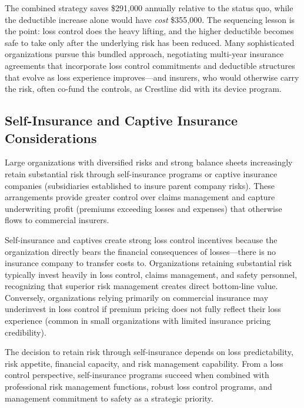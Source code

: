 \documentclass[11pt,openany]{book}
\begin{document}
The combined strategy saves \$291{,}000 annually relative to the status quo,
while the deductible increase alone would have \emph{cost} \$355{,}000. The
sequencing lesson is the point: loss control does the heavy lifting, and the
higher deductible becomes safe to take only after the underlying risk has been
reduced. Many sophisticated organizations pursue this bundled approach,
negotiating multi-year insurance agreements that incorporate loss control
commitments and deductible structures that evolve as loss experience
improves---and insurers, who would otherwise carry the risk, often co-fund the
controls, as Crestline did with its device program.

\subsection{Self-Insurance and Captive Insurance Considerations}

Large organizations with diversified risks and strong balance sheets
increasingly retain substantial risk through self-insurance programs or
captive insurance companies (subsidiaries established to insure parent company
risks). These arrangements provide greater control over claims management and
capture underwriting profit (premiums exceeding losses and expenses) that
otherwise flows to commercial insurers.

Self-insurance and captives create strong loss control incentives because the
organization directly bears the financial consequences of losses---there is no
insurance company to transfer costs to. Organizations retaining substantial
risk typically invest heavily in loss control, claims management, and safety
personnel, recognizing that superior risk management creates direct
bottom-line value. Conversely, organizations relying primarily on commercial
insurance may underinvest in loss control if premium pricing does not fully
reflect their loss experience (common in small organizations with limited
insurance pricing credibility).

The decision to retain risk through self-insurance depends on loss
predictability, risk appetite, financial capacity, and risk management
capability. From a loss control perspective, self-insurance programs succeed
when combined with professional risk management functions, robust loss control
programs, and management commitment to safety as a strategic priority.

\end{document}
